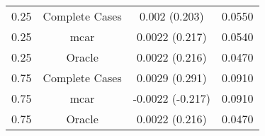 \begin{table}[ht]
\centering
\begin{tabular}{cccc}
  \hline
  \hline
0.25 & Complete Cases & 0.002 (0.203) & 0.0550 \\ 
  0.25 & mcar & 0.0022 (0.217) & 0.0540 \\ 
  0.25 & Oracle & 0.0022 (0.216) & 0.0470 \\ 
  0.75 & Complete Cases & 0.0029 (0.291) & 0.0910 \\ 
  0.75 & mcar & -0.0022 (-0.217) & 0.0910 \\ 
  0.75 & Oracle & 0.0022 (0.216) & 0.0470 \\ 
   \hline
\end{tabular}
\end{table}
